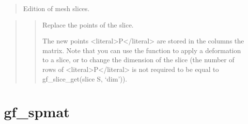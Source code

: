 \documentclass[a4paper,11pt,english]{sphinxmanual}
\begin{document}
\sphinxAtStartPar
{}
\begin{quote}

\sphinxAtStartPar
Edition of mesh slices.
\end{quote}

\sphinxAtStartPar
{}
\begin{quote}

\sphinxAtStartPar
{}
\begin{quote}

\sphinxAtStartPar
Replace the points of the slice.

\sphinxAtStartPar
The new points \textless{}literal\textgreater{}P\textless{}/literal\textgreater{} are stored in the columns the matrix. Note that
you can use the function to apply a deformation to a slice, or to
change the dimension of the slice (the number of rows of \textless{}literal\textgreater{}P\textless{}/literal\textgreater{} is not
required to be equal to gf\_slice\_get(slice S, ‘dim’)).
\end{quote}
\end{quote}


\section{gf\_spmat}
\label{\detokenize{scilab/cmdref_gf_spmat:gf-spmat}}\label{\detokenize{scilab/cmdref_gf_spmat::doc}}
\sphinxAtStartPar
{}
\end{document}
